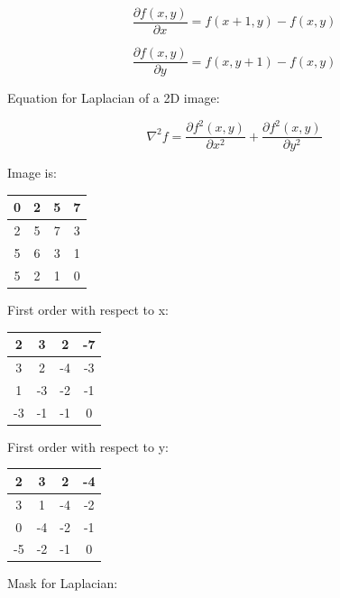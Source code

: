 \documentclass[conference]{IEEEtran}
\begin{document}
\begin{equation}
\frac{\partial f(x, y)}{\partial x} = f(x+1, y) - f(x, y)
\end{equation}

\begin{equation}
\frac{\partial f(x, y)}{\partial y} = f(x, y+1) - f(x, y)
\end{equation}

Equation for Laplacian of a 2D image:

\begin{equation}
\nabla^2 f = \frac{\partial f^2(x, y)}{\partial x^2} + \frac{\partial f^2(x, y)}{\partial y^2}
\end{equation}

Image is:

\begin{center}
\begin{tabular}{ |c|c|c|c| } 
\hline
0 & 2 & 5 & 7 \\ \hline
2 & 5 & 7 & 3\\ \hline
5 & 6 & 3 & 1\\ \hline
5 & 2 & 1 & 0 \\ \hline
\end{tabular}
\end{center}

First order with respect to x:

\begin{center}
\begin{tabular}{ |c|c|c|c| } 
\hline
2 & 3 & 2 & -7 \\ \hline
3 & 2 & -4 & -3\\ \hline
1 & -3 & -2 & -1\\ \hline
-3 & -1 & -1 & 0 \\ \hline
\end{tabular}
\end{center}

First order with respect to y:

\begin{center}
\begin{tabular}{ |c|c|c|c| } 
\hline
2 & 3 & 2 & -4 \\ \hline
3 & 1 & -4 & -2\\ \hline
0 & -4 & -2 & -1\\ \hline
-5 & -2 & -1 & 0 \\ \hline
\end{tabular}
\end{center}

Mask for Laplacian:
\end{document}
